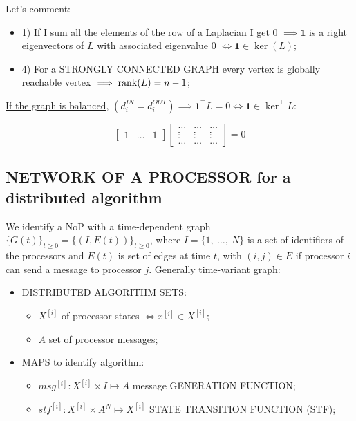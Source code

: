 Let's comment:
\begin{itemize}
\item{1)} If I sum all the elements of the row of a Laplacian I get 0 $\implies \mathbf{1}$ is a right eigenvectors of $L$ with associated eigenvalue 0 $\iff \mathbf{1} \in \ker(L)$;
\item{4)} For a STRONGLY CONNECTED GRAPH every vertex is globally reachable vertex $\implies \operatorname{rank}(L)=n-1$;
\end{itemize}

\underline{If the graph is balanced}, $(d_i^{IN} = d_i^{OUT}) \implies \mathbf{1}^\top L = 0 \iff \mathbf{1} \in \ker^{\perp}{L}$:

\[
	\begin{bmatrix}1&\dots&1\end{bmatrix}
	\begin{bmatrix}\dots&\dots&\dots\\ \vdots&\vdots&\vdots\\ \dots&\dots&\dots\end{bmatrix} = 0
\]

\subsection{NETWORK OF A PROCESSOR for a distributed algorithm}

We identify a NoP with a time-dependent graph $\{G(t)\}_{t\geq 0} = \{(I,E(t))\}_{t\geq 0 }$, where $I = \{1,\ \dots,\ N\}$ is a set of identifiers of the processors and $E(t)$ is set of edges at time $t$, with $(i,j)\in E$ if processor $i$ can send a message to processor $j$. Generally time-variant graph:

\begin{itemize}
\item{DISTRIBUTED ALGORITHM} SETS:
\begin{itemize}
\item $X^{[i]}$ of processor states $\iff x^{[i]} \in X^{[i]}$;
\item $A$ set of processor messages;
\end{itemize}
\item{MAPS to identify algorithm}:
\begin{itemize}
\item $msg^{[i]} : X^{[i]}\times I \mapsto A$ message GENERATION FUNCTION;
\item $stf^{[i]} : X^{[i]}\times A^N \mapsto X^{[i]}$ STATE TRANSITION FUNCTION (STF);
\end{itemize}
\end{itemize}

